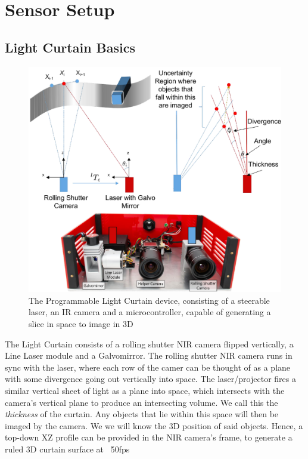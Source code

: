 
\section{Sensor Setup}

\subsection{Light Curtain Basics}

\begin{figure}[h]
   \centering
   \begin{minipage}{0.5\textwidth}
       \centering
       \includegraphics[width=1.0\textwidth]{figures/LC.pdf} %
   \end{minipage}\hfill
   \centering
   \caption{The Programmable Light Curtain device, consisting of a steerable laser, an IR camera and a microcontroller, capable of generating a slice in space to image in 3D}
\end{figure}

The Light Curtain consists of a rolling shutter NIR camera flipped vertically, a Line Laser module and a Galvomirror. The rolling shutter NIR camera runs in sync with the laser, where each row of the camer can be thought of as a plane with some divergence going out vertically into space. The laser/projector fires a similar vertical sheet of light as a plane into space, which intersects with the camera's vertical plane to produce an intersecting volume. We call this the \textit{thickness} of the curtain. Any objects that lie within this space will then be imaged by the camera. We we will know the 3D position of said objects. Hence, a top-down XZ profile can be provided in the NIR camera's frame, to generate a ruled 3D curtain surface at ~50fps

